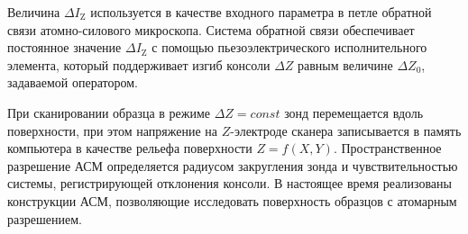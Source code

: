 Величина $\Delta I_\mathrm{Z}$ используется в качестве входного параметра в петле обратной связи атомно-силового микроскопа. Система обратной связи обеспечивает постоянное значение $\Delta I_\mathrm{Z}$ с помощью пьезоэлектрического исполнительного элемента, который поддерживает изгиб консоли $\Delta Z$ равным величине $\Delta Z_0$, задаваемой оператором.

При сканировании образца в режиме $\Delta Z = const$ зонд перемещается вдоль поверхности, при этом напряжение на $Z$-электроде сканера записывается в память компьютера в качестве рельефа поверхности $Z = f(X, Y)$. Пространственное разрешение АСМ определяется радиусом закругления зонда и чувствительностью системы, регистрирующей отклонения консоли. В настоящее время реализованы конструкции АСМ, позволяющие исследовать поверхность образцов с атомарным разрешением.

